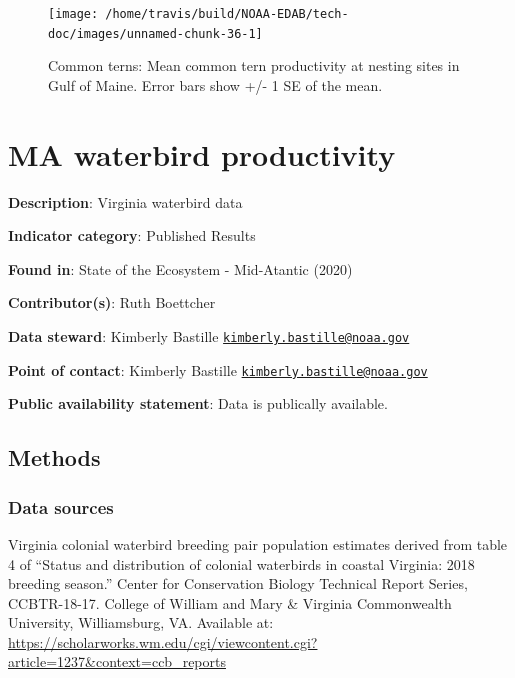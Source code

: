 \documentclass[
]{book}
\begin{document}
\begin{figure}

{\centering \texttt{[image: /home/travis/build/NOAA-EDAB/tech-doc/images/unnamed-chunk-36-1]} 

}

\caption{Common terns: Mean common tern productivity at nesting sites in Gulf of Maine. Error bars show +/- 1 SE of the mean.}\label{fig:unnamed-chunk-36}
\end{figure}

\hypertarget{ma-waterbird-productivity}{%
\chapter{MA waterbird productivity}\label{ma-waterbird-productivity}}

\textbf{Description}: Virginia waterbird data

\textbf{Indicator category}: Published Results

\textbf{Found in}: State of the Ecosystem - Mid-Atantic (2020)

\textbf{Contributor(s)}: Ruth Boettcher

\textbf{Data steward}: Kimberly Bastille \href{mailto:kimberly.bastille@noaa.gov}{\nolinkurl{kimberly.bastille@noaa.gov}}

\textbf{Point of contact}: Kimberly Bastille \href{mailto:kimberly.bastille@noaa.gov}{\nolinkurl{kimberly.bastille@noaa.gov}}

\textbf{Public availability statement}: Data is publically available.

\hypertarget{methods-34}{%
\section{Methods}\label{methods-34}}

\hypertarget{data-sources-34}{%
\subsection{Data sources}\label{data-sources-34}}

Virginia colonial waterbird breeding pair population estimates derived from table 4 of ``Status and distribution of colonial waterbirds in coastal Virginia: 2018 breeding season.'' Center for Conservation Biology Technical Report Series, CCBTR-18-17. College of William and Mary \& Virginia Commonwealth University, Williamsburg, VA. Available at: \url{https://scholarworks.wm.edu/cgi/viewcontent.cgi?article=1237\&context=ccb_reports}
\end{document}

